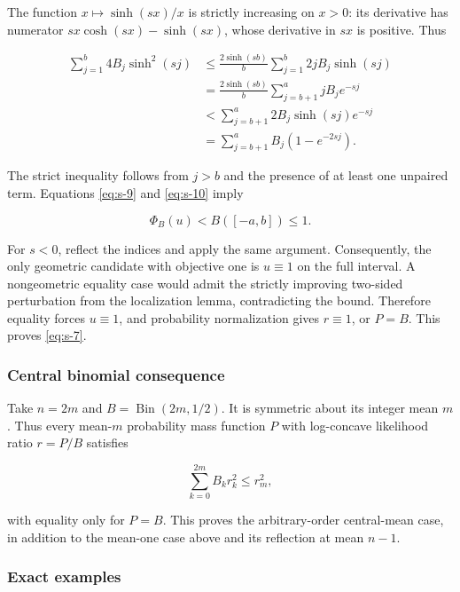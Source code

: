 \documentclass[11pt,a4paper]{article}
\theoremstyle{definition}
\theoremstyle{remark}
\begin{document}
The function \(x\mapsto\sinh(sx)/x\) is strictly increasing on \(x>0\):
its derivative has numerator \(sx\cosh(sx)-\sinh(sx)\), whose derivative
in \(sx\) is positive. Thus

\begin{equation}\label{eq:s-10}
\begin{aligned}
\sum_{j=1}^b4B_j\sinh^2(sj)
&\le\frac{2\sinh(sb)}b
\sum_{j=1}^b2jB_j\sinh(sj)\\
&=\frac{2\sinh(sb)}b
\sum_{j=b+1}^a jB_j e^{-sj}\\
&<\sum_{j=b+1}^a2B_j\sinh(sj)e^{-sj}\\
&=\sum_{j=b+1}^aB_j(1-e^{-2sj}).
\end{aligned}
\end{equation}

The strict inequality follows from \(j>b\) and the presence of at least
one unpaired term. Equations \eqref{eq:s-9} and \eqref{eq:s-10} imply

\[
\Phi_B(u)<B([-a,b])\le1.
\]

For \(s<0\), reflect the indices and apply the same argument.
Consequently, the only geometric candidate with objective one is
\(u\equiv1\) on the full interval. A nongeometric equality case would
admit the strictly improving two-sided perturbation from the
localization lemma, contradicting the bound. Therefore equality forces
\(u\equiv1\), and probability normalization gives \(r\equiv1\), or
\(P=B\). This proves \eqref{eq:s-7}.

\subsubsection{Central binomial
consequence}\label{scalar-central-binomial-consequence}

Take \(n=2m\) and \(B=\operatorname{Bin}(2m,1/2)\). It is symmetric
about its integer mean \(m\). Thus every mean-\(m\) probability mass
function \(P\) with log-concave likelihood ratio \(r=P/B\) satisfies

\[
\sum_{k=0}^{2m}B_kr_k^2\le r_m^2,
\]

with equality only for \(P=B\). This proves the arbitrary-order
central-mean case, in addition to the mean-one case above and its
reflection at mean \(n-1\).

\subsubsection{Exact examples}\label{scalar-exact-examples}
\end{document}
